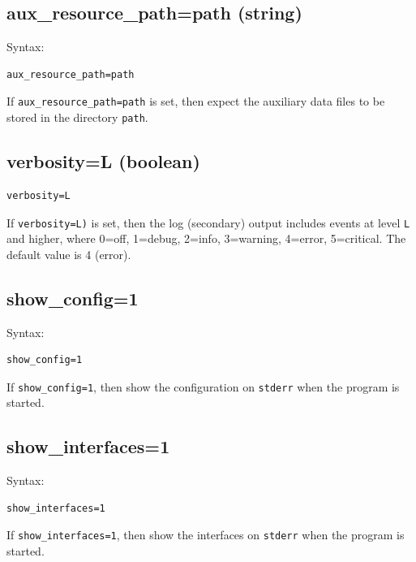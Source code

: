 \documentclass{book}
\begin{document}
\subsection{aux\_resource\_path=path (string)}
\label{auxresourcepath}
\begin{mdframed}[style=aaa]
Syntax:
  \begin{verbatim}
aux_resource_path=path        
  \end{verbatim}
\end{mdframed}
If \texttt{aux\_resource\_path=path} is set, then expect the auxiliary
data files to be stored in the directory \texttt{path}.

\subsection{verbosity=L (boolean)}
\label{verbosity}
\begin{mdframed}[style=aaa]
  \begin{verbatim}
verbosity=L                  
  \end{verbatim}
\end{mdframed}
If \texttt{verbosity=L)} is set, then the log (secondary) output
includes events at level \texttt{L} and higher, where 0=off, 1=debug,
2=info, 3=warning, 4=error, 5=critical.  The default value is 4
(error).

\subsection{show\_config=1}
\label{showconfig}
\begin{mdframed}[style=aaa]
Syntax:
  \begin{verbatim}
show_config=1             
  \end{verbatim}
\end{mdframed}
If \texttt{show\_config=1}, then show the configuration on \texttt{stderr} when
the program is started.

\subsection{show\_interfaces=1}
\label{showinterfaces}
\begin{mdframed}[style=aaa]
Syntax:
  \begin{verbatim}
show_interfaces=1        
  \end{verbatim}
\end{mdframed}
If \texttt{show\_interfaces=1}, then show the interfaces on \texttt{stderr} when the program is started.
\end{document}
